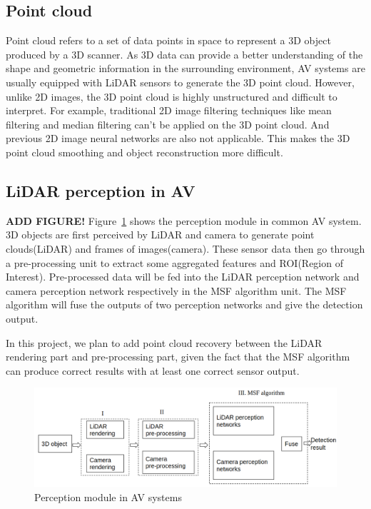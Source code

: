 
\subsection{Point cloud}

Point cloud refers to a set of data points in space to represent a 3D object produced by a 3D scanner. 
As 3D data can provide a better understanding of the shape and geometric information in the surrounding environment\cite{point-cloud-survey},
AV systems are usually equipped with LiDAR sensors to generate the 3D point cloud.
However, unlike 2D images, the 3D point cloud is highly unstructured and difficult to interpret.
For example, traditional 2D image filtering techniques like mean filtering\cite{mean-filter} and median filtering\cite{median-filter} can't be applied on the 3D point cloud.
And previous 2D image neural networks are also not applicable.
This makes the 3D point cloud smoothing and object reconstruction more difficult.

\subsection{LiDAR perception in AV}

\textbf{ADD FIGURE!}
Figure~\ref{fig:module} shows the perception module in common AV system\cite{apollo}.
3D objects are first perceived by LiDAR and camera to generate point clouds(LiDAR) and frames of images(camera).
These sensor data then go through a pre-processing unit to extract some aggregated features and ROI(Region of Interest).
Pre-processed data will be fed into the LiDAR perception network and camera perception network respectively in the MSF algorithm unit.
The MSF algorithm will fuse the outputs of two perception networks and give the detection output.

In this project, we plan to add point cloud recovery between the LiDAR rendering part and pre-processing part,
given the fact that the MSF algorithm can produce correct results with at least one correct sensor output.

\begin{figure}
	\centering
	\includegraphics[width=1\linewidth]{figure/structure.png}
	\caption{Perception module in AV systems}
	\label{fig:module}
\end{figure}
